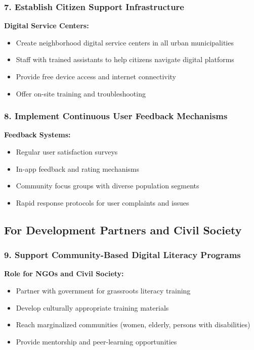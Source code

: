 \documentclass[12pt,a4paper]{article}
\begin{document}
\subsubsection{7. Establish Citizen Support Infrastructure}

\textbf{Digital Service Centers:}
\begin{itemize}
    \item Create neighborhood digital service centers in all urban municipalities
    \item Staff with trained assistants to help citizens navigate digital platforms
    \item Provide free device access and internet connectivity
    \item Offer on-site training and troubleshooting
\end{itemize}

\subsubsection{8. Implement Continuous User Feedback Mechanisms}

\textbf{Feedback Systems:}
\begin{itemize}
    \item Regular user satisfaction surveys
    \item In-app feedback and rating mechanisms
    \item Community focus groups with diverse population segments
    \item Rapid response protocols for user complaints and issues
\end{itemize}

\subsection{For Development Partners and Civil Society}

\subsubsection{9. Support Community-Based Digital Literacy Programs}

\textbf{Role for NGOs and Civil Society:}
\begin{itemize}
    \item Partner with government for grassroots literacy training
    \item Develop culturally appropriate training materials
    \item Reach marginalized communities (women, elderly, persons with disabilities)
    \item Provide mentorship and peer-learning opportunities
\end{itemize}
\end{document}
